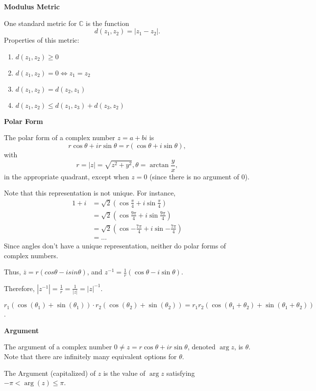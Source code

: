 \documentclass{article}
\newcommand{\inv}{^{-1}}
\newcommand{\C}{\mathbb C}
\begin{document}
\medskip\noindent\textbf{Modulus Metric}

    One standard metric for $\C$ is the function $$d(z_1, z_2) = |z_1 - z_2|.$$
    Properties of this metric:

    \begin{enumerate}
        \item $d(z_1, z_2) \geq 0$
        \item $d(z_1, z_2) = 0 \iff z_1 = z_2$
        \item $d(z_1, z_2) = d(z_2, z_1)$
        \item $d(z_1, z_2) \leq d(z_1, z_3) + d(z_3, z_2)$
    \end{enumerate}

\medskip\noindent\textbf{Polar Form}

    The polar form of a complex number $z = a+bi$ is $$r\cos\theta + ir\sin\theta = r(\cos\theta + i\sin\theta),$$ with $$r = |z| = \sqrt{z^2+y^2}, \theta = \arctan{\frac yx},$$ in the appropriate quadrant, except when $z=0$ (since there is no argument of $0$).

    Note that this representation is not unique. For instance,
    \begin{align*}
        1 + i &= \sqrt{2}(\cos{\frac{\pi}4} + i\sin{\frac{\pi}4}) \\
              &= \sqrt{2}(\cos{\frac{9\pi}4} + i\sin{\frac{9\pi}4}) \\
              &= \sqrt{2}(\cos{-\frac{7\pi}4} + i\sin{-\frac{7\pi}4}) \\
              &= \hdots
    \end{align*} Since angles don't have a unique representation, neither do polar forms of complex numbers.

    Thus, $\overline z = r(cos\theta - isin\theta)$, and $ z\inv = \frac1r(\cos\theta-i\sin\theta).$

    Therefore, $|z\inv| = \frac1r = \frac1{|z|} = |z|\inv$.

    $r_1(\cos(\theta_1) + \sin(\theta_1)) \cdot r_2(\cos(\theta_2) + \sin(\theta_2)) = r_1r_2(\cos(\theta_1 + \theta_2) + \sin(\theta_1 + \theta_2))$.

\medskip\noindent\textbf{Argument}

    The argument of a complex number $0 \neq z = r\cos\theta + ir\sin\theta$, denoted $\arg z$, is $\theta$. Note that there are infinitely many equivalent options for $\theta$.

    The Argument (capitalized) of $z$ is the value of $\arg z$ satisfying $-\pi < \arg(z) \leq \pi$.
\end{document}
